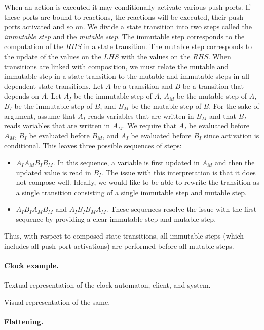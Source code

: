 When an action is executed it may conditionally activate various push ports.
If these ports are bound to reactions, the reactions will be executed, their push ports activated and so on.
We divide a state transition into two steps called the \emph{immutable step} and the \emph{mutable step}.
The immutable step corresponds to the computation of the $RHS$ in a state transition.
The mutable step corresponds to the update of the values on the $LHS$ with the values on the $RHS$.
When transitions are linked with composition, we must relate the mutable and immutable step in a state transition to the mutable and immutable steps in all dependent state transitions.
Let $A$ be a transition and $B$ be a transition that depends on $A$.
Let $A_I$ be the immutable step of $A$, $A_M$ be the mutable step of $A$, $B_I$ be the immutable step of $B$, and $B_M$ be the mutable step of $B$.
For the sake of argument, assume that $A_I$ reads variables that are written in $B_M$ and that $B_I$ reads variables that are written in $A_M$.
We require that $A_I$ be evaluated before $A_M$, $B_I$ be evaluated before $B_M$, and $A_I$ be evaluated before $B_I$ since activation is conditional.
This leaves three possible sequences of steps:
\begin{itemize}
\item $A_I A_M B_I B_M$.  In this sequence, a variable is first updated in $A_M$ and then the updated value is read in $B_I$.  The issue with this interpretation is that it does not compose well.  Ideally, we would like to be able to rewrite the transition as a single transition consisting of a single immutable step and mutable step.
\item $A_I B_I A_M B_M$ and $A_I B_I B_M A_M$.  These sequences resolve the issue with the first sequence by providing a clear immutable step and mutable step.
\end{itemize}
Thus, with respect to composed state transitions, all immutable steps (which includes all push port activations) are performed before all mutable steps.

\paragraph{Clock example.}

Textual representation of the clock automaton, client, and system.

Visual representation of the same.

\paragraph{Flattening.}

